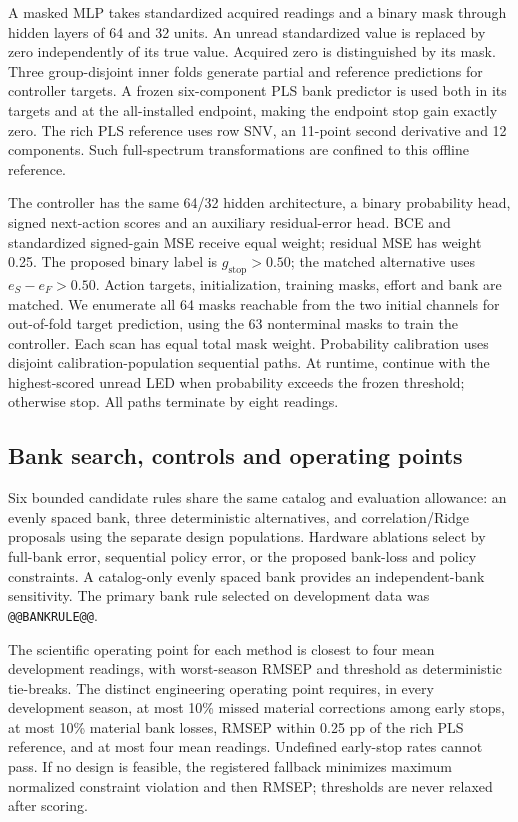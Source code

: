 \documentclass[11pt,a4paper]{article}
\begin{document}
A masked MLP takes standardized acquired readings and a binary mask through hidden layers of 64 and 32 units. An unread standardized value is replaced by zero independently of its true value. Acquired zero is distinguished by its mask. Three group-disjoint inner folds generate partial and reference predictions for controller targets. A frozen six-component PLS bank predictor is used both in its targets and at the all-installed endpoint, making the endpoint stop gain exactly zero. The rich PLS reference uses row SNV, an 11-point second derivative and 12 components. Such full-spectrum transformations are confined to this offline reference.

The controller has the same 64/32 hidden architecture, a binary probability head, signed next-action scores and an auxiliary residual-error head. BCE and standardized signed-gain MSE receive equal weight; residual MSE has weight 0.25. The proposed binary label is $g_{\mathrm{stop}}>0.50$; the matched alternative uses $e_S-e_F>0.50$. Action targets, initialization, training masks, effort and bank are matched. We enumerate all 64 masks reachable from the two initial channels for out-of-fold target prediction, using the 63 nonterminal masks to train the controller. Each scan has equal total mask weight. Probability calibration uses disjoint calibration-population sequential paths. At runtime, continue with the highest-scored unread LED when probability exceeds the frozen threshold; otherwise stop. All paths terminate by eight readings.

\subsection{Bank search, controls and operating points}
Six bounded candidate rules share the same catalog and evaluation allowance: an evenly spaced bank, three deterministic alternatives, and correlation/Ridge proposals using the separate design populations. Hardware ablations select by full-bank error, sequential policy error, or the proposed bank-loss and policy constraints. A catalog-only evenly spaced bank provides an independent-bank sensitivity. The primary bank rule selected on development data was \texttt{@@BANKRULE@@}.

The scientific operating point for each method is closest to four mean development readings, with worst-season RMSEP and threshold as deterministic tie-breaks. The distinct engineering operating point requires, in every development season, at most 10\% missed material corrections among early stops, at most 10\% material bank losses, RMSEP within 0.25 pp of the rich PLS reference, and at most four mean readings. Undefined early-stop rates cannot pass. If no design is feasible, the registered fallback minimizes maximum normalized constraint violation and then RMSEP; thresholds are never relaxed after scoring.
\end{document}
